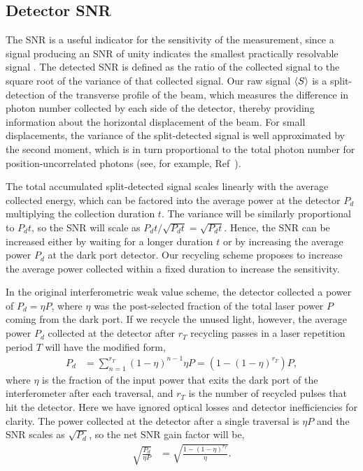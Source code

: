 \subsection{Detector SNR}\label{sec:snr}
The SNR is a useful indicator for the sensitivity of the measurement, since a signal producing an SNR of unity indicates the smallest practically resolvable signal \cite{Barnett2003}.  The detected SNR is defined as the ratio of the collected signal to the square root of the variance of that collected signal.  Our raw signal $\left\langle S \right\rangle$ is a split-detection of the transverse profile of the beam, which measures the difference in photon number collected by each side of the detector, thereby providing information about the horizontal displacement of the beam.  For small displacements, the variance of the split-detected signal is well approximated by the second moment, which is in turn proportional to the total photon number for position-uncorrelated photons (see, for example, Ref~\cite{Barnett2003}).

The total accumulated split-detected signal scales linearly with the average collected energy, which can be factored into the average power at the detector $P_d$ multiplying the collection duration $t$.  The variance will be similarly proportional to $P_d t$, so the SNR will scale as $P_dt/\sqrt{P_dt} = \sqrt{P_dt}$.  Hence, the SNR can be increased either by waiting for a longer duration $t$ or by increasing the average power $P_d$ at the dark port detector.  Our recycling scheme proposes to increase the average power collected within a fixed duration to increase the sensitivity.  

In the original interferometric weak value scheme, the detector collected a power of $P_d= \eta P$, where $\eta$ was the post-selected fraction of the total laser power $P$ coming from the dark port. If we recycle the unused light, however, the average power $P_d$ collected at the detector after $r_T$ recycling passes in a laser repetition period $T$ will have the modified form, 
\begin{align}\label{eq:power}
  P_d &= \sum_{n=1}^{r_T} (1-\eta)^{n-1} \eta P = (1-(1-\eta)^{r_T}) P,
\end{align}
where $\eta$ is the fraction of the input power that exits the dark port of the interferometer after each traversal, and $r_T$ is the number of recycled pulses that hit the detector.  Here we have ignored optical losses and detector inefficiencies for clarity.  The power collected at the detector after a single traversal is $\eta P$ and the SNR scales as $\sqrt{P_d}$, so the net SNR gain factor will be,
\begin{align}\label{eq:powergain}
  \sqrt{\frac{P_d}{\eta P}} &= \sqrt{\frac{1 - (1-\eta)^{r_T}}{\eta}}.
\end{align}

